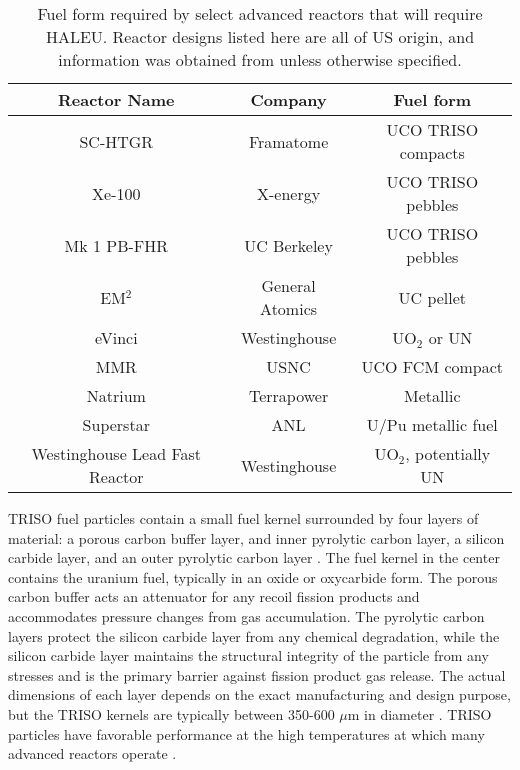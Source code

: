 \begin{table}[ht]
    \centering
    \caption{Fuel form required by select advanced reactors that will 
    require \gls{HALEU}. Reactor designs listed here are all of US origin, 
    and information was obtained from \cite{hussain_advances_2018} unless 
    otherwise specified.}
    \label{tab:fuel_forms}
    \begin{tabular}{c c c}
        \hline
        Reactor Name & Company & Fuel form \\\hline 
        SC-HTGR & Framatome & UCO TRISO compacts \\
        Xe-100 \cite{harlan_x-energy_2018} & X-energy & UCO TRISO pebbles \\
        Mk 1 PB-FHR & UC Berkeley & UCO TRISO pebbles\\
        EM$^2$ & General Atomics & UC pellet \\
        eVinci & Westinghouse & UO$_2$ or UN \\
        \gls{MMR} \cite{mitchell_usnc_2020} & \gls{USNC} & UCO FCM compact\\
        Natrium & Terrapower & Metallic \\
        Superstar  & \gls{ANL} & U/Pu metallic fuel \\
        Westinghouse Lead Fast Reactor  & Westinghouse & UO$_2$, potentially UN \\
        \hline        
        
    \end{tabular}
\end{table}

\gls{TRISO} fuel particles contain 
a small fuel kernel surrounded by four layers of material: a porous carbon 
buffer layer, and inner pyrolytic carbon layer, a silicon carbide layer, 
and an outer pyrolytic carbon layer \cite{demkowicz_coated_2019}. The fuel 
kernel in the center contains the uranium fuel, typically in an oxide 
or oxycarbide form. The porous carbon buffer acts an attenuator for any 
recoil fission products and accommodates pressure changes from gas 
accumulation.
The pyrolytic carbon layers protect the silicon carbide layer from 
any chemical degradation, while the silicon carbide layer maintains the 
structural integrity of the particle from any stresses and is the primary 
barrier against fission product gas release. The actual dimensions 
of each layer depends on the exact manufacturing and design purpose, but 
the \gls{TRISO} kernels are typically between 350-600 $\mu$m in diameter 
\cite{demkowicz_coated_2019}. \gls{TRISO} particles have 
favorable performance at the high temperatures 
at which many advanced reactors operate \cite{demkowicz_coated_2019}. 

